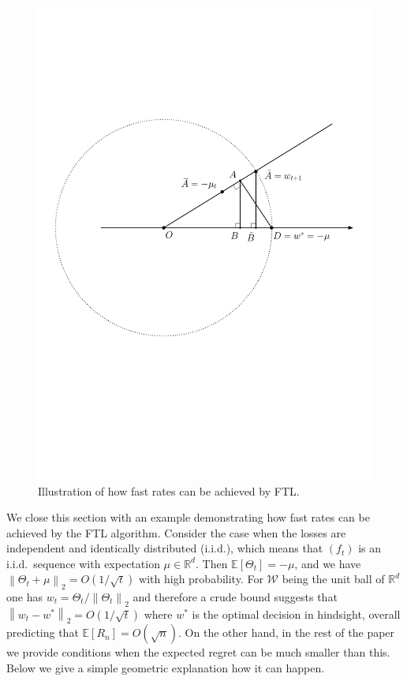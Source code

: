 \documentclass[english]{article}
\newcommand{\cW}{\mathcal{W}}
\newcommand{\Exp}[1]{\mathbb{E}\left[ #1 \right]}
\newcommand{\real}{\mathbb{R}}
\newcommand{\R}{\mathbb{R}}
\newcommand{\norm}[1]{\left\| #1 \right\|}
\begin{document}
\begin{figure}
	\vspace{-.7cm}
\begin{framed}
	\centering
	\includegraphics[width = \textwidth,
	trim={6.2cm 3.5cm 1.5cm 0},clip]
	{figures/ExcessError}
	\vspace{-0.4cm}
	\caption{Illustration of how fast rates can be achieved by FTL.
	}
	\label{fig:excesserror}
	\vspace{-0.3cm}
\end{framed}
	\vspace{-0.7cm}
\end{figure} 
%
We close this section with an example demonstrating how fast rates can be achieved by the FTL algorithm. Consider the case when the losses are independent and identically distributed (i.i.d.),
which means that $(f_t)$ is an i.i.d.\ sequence with expectation $\mu \in \real^d$. Then  $\Exp{\Theta_t} = -\mu$, and we have $\norm{\Theta_t +\mu}_2 = O(1/\sqrt{t})$ with high probability. 
For $\cW$ being the unit ball of $\R^d$ one has $w_t = \Theta_t/\norm{\Theta_t}_2$ and therefore
a crude bound suggests that $\norm{w_t-  w^* }_2 = O(1/\sqrt{t})$ where $w^*$ is the optimal decision in hindsight, overall predicting that $\Exp{R_n} = O(\sqrt{n})$.
On the other hand, in the rest of the paper we provide conditions when the expected regret can be much smaller than this. Below we give a simple geometric explanation how it can happen.
\end{document}
